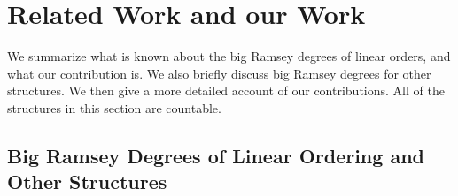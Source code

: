 \documentclass[11pt]{article}
\newcommand{\COL}{\operatorname{COL}}
\newcommand{\N}{\mathbb{N}}
\newcommand{\numpoints}{n}
\newcommand{\numcolors}{c}
\theoremstyle{plain}
\newtheorem{theorem}{Theorem}[section]
\theoremstyle{definition}
\begin{document}








\section{Related Work and our Work} \label{se:summary}

We summarize what is known about the big Ramsey degrees of linear orders,
and what our contribution is.
We also briefly discuss big Ramsey degrees for other structures.
We then give a more detailed account of our contributions.
All of the structures in this section are countable. 


\subsection{Big Ramsey Degrees of Linear Ordering and Other Structures}
\end{document}
